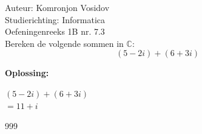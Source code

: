 \documentclass[a4paper]{article}
\begin{document}
	
	\noindent \large Auteur: Komronjon Vosidov \\
	\noindent \large Studierichting: Informatica\\
	\noindent \large Oefeningenreeks 1B nr. 7.3\\
	
	
	
	\normalsize
	Bereken de volgende sommen in $\mathbb{C}$:
	\begin{equation*}
		(5-2i)+(6+3i)
	\end{equation*}
	
	
	\noindent \textbf{Oplossing:}
	
	$(5-2i)+(6+3i)$ \\	
	
	$= 11+i $ \\
	
\begin{thebibliography}{999}
	
\end{thebibliography}	
	
	
\end{document}
